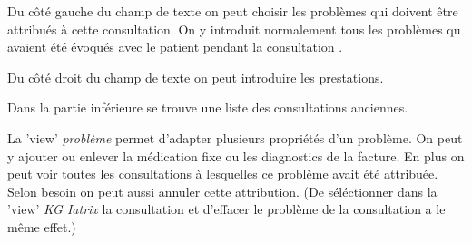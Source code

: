 Du côté gauche du champ de texte on peut choisir les problèmes qui doivent être attribués à cette consultation. On y introduit normalement tous les problèmes qu avaient été évoqués avec le patient pendant la consultation .

Du côté droit du champ de texte on peut introduire les prestations.

Dans la partie inférieure se trouve une liste des consultations anciennes.

La 'view' \textit{problème} permet d'adapter plusieurs propriétés d'un problème. On peut y ajouter ou enlever la médication fixe ou les diagnostics de la facture. En plus on peut voir toutes les consultations à lesquelles ce problème avait été attribuée. Selon besoin on peut aussi annuler cette attribution.
(De  séléctionner dans la 'view' \textit{KG Iatrix} la consultation et d'effacer le problème de la consultation a le même effet.)


